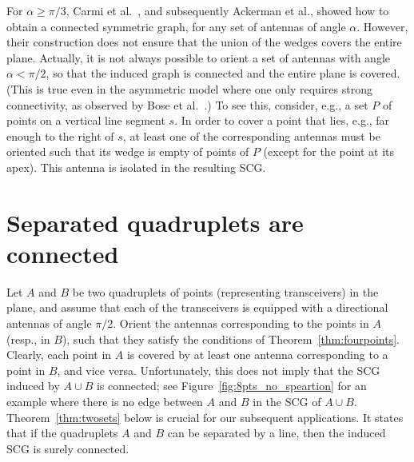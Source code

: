 \documentclass[11pt,letter]{article}
\newcommand{\old}[1]{{{}}}
\begin{document}
For $\alpha \geq \pi/3$,
Carmi et al.~\cite{CKLR09}, and subsequently Ackerman et al.\cite{AGP10},
showed how to obtain a connected symmetric graph, for any set of antennas of angle $\alpha$.
However, their construction does not ensure that the union of the wedges covers the entire plane.
Actually, it is not always possible to orient a set of antennas with angle $\alpha < \pi/2$, so that the induced graph is connected and the entire plane is covered. (This is true even in the asymmetric model where one only requires strong connectivity, as observed by Bose et al.~\cite{BCDFKM11}.)
\old{
To see this, consider, e.g., a set $P$ of points on a line.
At least one of the corresponding antennas must be oriented such that its wedge is empty of other points of $P$.
See Figure~\ref{fig:counter_example};
in order to cover the plane, one needs, in particular, to cover the point $p$. However, if $p$ is far enough from the line,
then any antenna that covers $p$ cannot cover any other point of $P$ (except for the point at its apex).
Thus, the antenna that covers $p$ is isolated in the resulting SCG.


\begin{figure}[htp]
   \centering
       \texttt{[image: fig/example\_figure1]}
   \caption{The antenna that covers $p$ is isolated in the resulting SCG.}
   \label{fig:counter_example}
\end{figure}
}
To see this, consider, e.g., a set $P$ of points on a vertical line segment $s$.
In order to cover a point that lies, e.g., far enough to the right of $s$,
at least one of the corresponding antennas must be oriented such that its wedge is empty of points of $P$ (except for the point at its apex).
This antenna is isolated in the resulting SCG.

\section{Separated quadruplets are connected}\label{sec:A_cub_B}

Let $A$ and $B$ be two quadruplets of points (representing transceivers) in the plane, and assume that each of the transceivers
is equipped with a directional antennas of angle $\pi/2$. Orient the antennas corresponding to the points in $A$ (resp., in $B$),
such that they satisfy the conditions of Theorem~\ref{thm:fourpoints}.
Clearly, each point in $A$ is covered by at least one antenna corresponding to a point in $B$, and vice versa.
Unfortunately, this does not imply that the SCG induced by $A \cup B$ is connected;
see Figure~\ref{fig:8pts_no_speartion} for an example where there is no edge between
$A$ and $B$ in the SCG of $A \cup B$.
Theorem~\ref{thm:twosets} below is crucial for our subsequent applications. It states that if the quadruplets $A$ and $B$ can be separated
by a line, then the induced SCG is surely connected.
\end{document}
